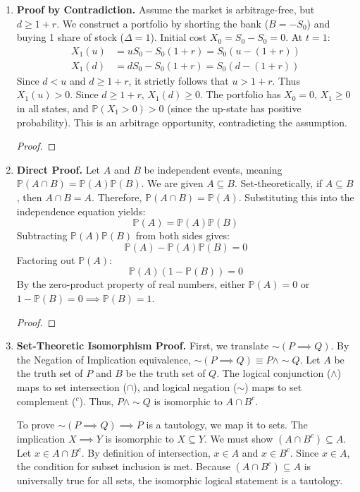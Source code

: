 \documentclass[11pt]{article}
\renewcommand{\qedsymbol}{$\blacksquare$}
\begin{document}
\begin{enumerate}
    \item \textbf{Proof by Contradiction.} Assume the market is arbitrage-free, but $d \ge 1+r$. We construct a portfolio by shorting the bank ($B = -S_0$) and buying 1 share of stock ($\Delta = 1$). Initial cost $X_0 = S_0 - S_0 = 0$. At $t=1$:
    \begin{align*}
        X_1(u) &= uS_0 - S_0(1+r) = S_0(u - (1+r)) \\
        X_1(d) &= dS_0 - S_0(1+r) = S_0(d - (1+r))
    \end{align*}
    Since $d < u$ and $d \ge 1+r$, it strictly follows that $u > 1+r$. Thus $X_1(u) > 0$. Since $d \ge 1+r$, $X_1(d) \ge 0$. The portfolio has $X_0 = 0$, $X_1 \ge 0$ in all states, and $\mathbb{P}(X_1 > 0) > 0$ (since the up-state has positive probability). This is an arbitrage opportunity, contradicting the assumption.
    \begin{proof}\renewcommand{\qedsymbol}{$\blacksquare$}\end{proof}

    \item \textbf{Direct Proof.} Let $A$ and $B$ be independent events, meaning $\mathbb{P}(A \cap B) = \mathbb{P}(A)\mathbb{P}(B)$. We are given $A \subseteq B$. Set-theoretically, if $A \subseteq B$, then $A \cap B = A$. Therefore, $\mathbb{P}(A \cap B) = \mathbb{P}(A)$. Substituting this into the independence equation yields:
    \[ \mathbb{P}(A) = \mathbb{P}(A)\mathbb{P}(B) \]
    Subtracting $\mathbb{P}(A)\mathbb{P}(B)$ from both sides gives:
    \[ \mathbb{P}(A) - \mathbb{P}(A)\mathbb{P}(B) = 0 \]
    Factoring out $\mathbb{P}(A)$:
    \[ \mathbb{P}(A)(1 - \mathbb{P}(B)) = 0 \]
    By the zero-product property of real numbers, either $\mathbb{P}(A) = 0$ or $1 - \mathbb{P}(B) = 0 \implies \mathbb{P}(B) = 1$.
    \begin{proof}\renewcommand{\qedsymbol}{$\blacksquare$}\end{proof}

    \item \textbf{Set-Theoretic Isomorphism Proof.} First, we translate $\sim(P \implies Q)$. By the Negation of Implication equivalence, $\sim(P \implies Q) \equiv P \land \sim Q$. Let $A$ be the truth set of $P$ and $B$ be the truth set of $Q$. The logical conjunction ($\land$) maps to set intersection ($\cap$), and logical negation ($\sim$) maps to set complement ($^c$). Thus, $P \land \sim Q$ is isomorphic to $A \cap B^c$. 
    
    To prove $\sim(P \implies Q) \implies P$ is a tautology, we map it to sets. The implication $X \implies Y$ is isomorphic to $X \subseteq Y$. We must show $(A \cap B^c) \subseteq A$. Let $x \in A \cap B^c$. By definition of intersection, $x \in A$ and $x \in B^c$. Since $x \in A$, the condition for subset inclusion is met. Because $(A \cap B^c) \subseteq A$ is universally true for all sets, the isomorphic logical statement is a tautology.
    

\end{enumerate}
\end{document}
